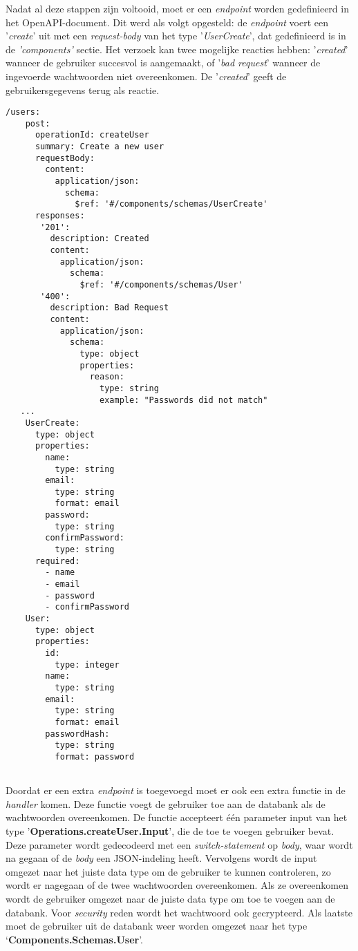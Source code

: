 Nadat al deze stappen zijn voltooid, moet er een \textit{endpoint} worden gedefinieerd in het OpenAPI-document. Dit werd als volgt opgesteld: de \textit{endpoint} voert een '\textit{create}' uit met een \textit{request-body} van het type '\textit{UserCreate}', dat gedefinieerd is in de \textit{'components'} sectie. Het verzoek kan twee mogelijke reacties hebben: '\textit{created}' wanneer de gebruiker succesvol is aangemaakt, of '\textit{bad request}' wanneer de ingevoerde wachtwoorden niet overeenkomen. De '\textit{created}' geeft de gebruikersgegevens terug als reactie. 
\begin{lstlisting}[caption=openapi.yaml file]
  /users:
    post:
      operationId: createUser
      summary: Create a new user
      requestBody:
        content:
          application/json:
            schema:
              $ref: '#/components/schemas/UserCreate'
      responses:
       '201':
         description: Created
         content:
           application/json:
             schema:
               $ref: '#/components/schemas/User'
       '400':
         description: Bad Request
         content:
           application/json:
             schema:
               type: object
               properties:
                 reason:
                   type: string
                   example: "Passwords did not match"
   ...
    UserCreate:
      type: object
      properties:
        name:
          type: string
        email:
          type: string
          format: email
        password:
          type: string
        confirmPassword:
          type: string
      required:
        - name
        - email
        - password
        - confirmPassword
    User:
      type: object
      properties:
        id:
          type: integer
        name:
          type: string
        email:
          type: string
          format: email
        passwordHash:
          type: string
          format: password
 
\end{lstlisting}
Doordat er een extra \textit{endpoint} is toegevoegd moet er ook een extra functie in de \textit{handler} komen. Deze functie voegt de gebruiker toe aan de databank als de wachtwoorden overeenkomen. De functie accepteert één parameter input van het type '\textbf{Operations.createUser.Input}', die de toe te voegen gebruiker bevat.  Deze parameter wordt gedecodeerd met een \textit{switch-statement} op \textit{body}, waar wordt na gegaan of de \textit{body} een JSON-indeling heeft. Vervolgens wordt de input omgezet naar het juiste data type om de gebruiker te kunnen controleren, zo wordt er nagegaan of de twee wachtwoorden overeenkomen. Als ze overeenkomen wordt de gebruiker omgezet naar de juiste data type om toe te voegen aan de databank. Voor \textit{security} reden wordt het wachtwoord ook gecrypteerd. Als laatste moet de gebruiker uit de databank weer worden omgezet naar het type ‘\textbf{Components.Schemas.User}’.

